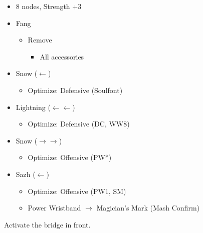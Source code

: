 \begin{multicols}{2}
\begin{menu}
\begin{itemize}
\begin{itemize}
\begin{itemize}
\begin{itemize}
                \item 8 nodes, Strength +3
            \end{itemize}
        \end{itemize}
    \end{itemize}
    \equip
    \begin{itemize}
        \item Fang 
        \begin{itemize}
            \item Remove
            \begin{itemize}
                \item All accessories
            \end{itemize}
        \end{itemize}
        \item Snow ($\leftarrow$)
        \begin{itemize}
                \item Optimize: Defensive (Soulfont)
        \end{itemize}
        \item Lightning ($\leftarrow\leftarrow$)
        \begin{itemize}
                \item Optimize: Defensive (DC, WW8)
        \end{itemize}
        \item Snow ($\rightarrow\rightarrow$)
        \begin{itemize}
                \item Optimize: Offensive (PW*)
        \end{itemize}
        \item Sazh ($\leftarrow$)
        \begin{itemize}
                \item Optimize: Offensive (PW1, SM)
                \item Power Wristband $\rightarrow$ Magician's Mark (Mash Confirm)
        \end{itemize}
    \end{itemize}
\end{itemize}
\end{menu}


Activate the bridge in front.


\end{multicols}
